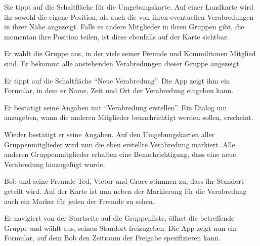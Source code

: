\documentclass[parskip=full,11pt]{scrartcl}
\begin{document}
{Sie tippt auf die Schaltfläche für die Umgebungskarte.}
{Auf einer Landkarte wird ihr sowohl die eigene Position, als auch die von ihren
eventuellen Verabredungen in ihrer Nähe angezeigt.
Falls es andere Mitglieder in ihren Gruppen gibt, die momentan
ihre Position teilen, ist diese ebenfalls auf der Karte sichtbar.}


{Er wählt die Gruppe aus, in der viele seiner Freunde und Kommilitonen Mitglied sind.}
{Er bekommt alle anstehenden Verabredungen dieser Gruppe angezeigt.}

{Er tippt auf die Schaltfläche \enquote{Neue Verabredung}.}
{Die App zeigt ihm ein Formular, in dem er Name, Zeit und Ort der Verabredung eingeben kann.}

{Er bestätigt seine Angaben mit \enquote{Verabredung erstellen}.}
{Ein Dialog um anzugeben, wann die anderen Mitglieder benachrichtigt werden sollen, erscheint.}

{Wieder bestätigt er seine Angaben.}
{Auf den Umgebungskarten aller Gruppenmitglieder wird nun die eben erstellte Verabredung markiert.
Alle anderen Gruppenmitglieder erhalten eine Benachrichtigung,
dass eine neue Verabredung hinzugefügt wurde.}

{Bob und seine Freunde Ted, Victor und Grace stimmen zu, dass ihr Standort geteilt wird.}
{Auf der Karte ist nun neben der Markierung für die Verabredung auch ein Marker für
jeden der Freunde zu sehen.}


{Er navigiert von der Startseite auf die Gruppenliste, öffnet die betreffende Gruppe und wählt aus, seinen Standort freizugeben.}
{Die App zeigt nun ein Formular, auf dem Bob den Zeitraum der Freigabe spezifizieren kann.}
\end{document}
